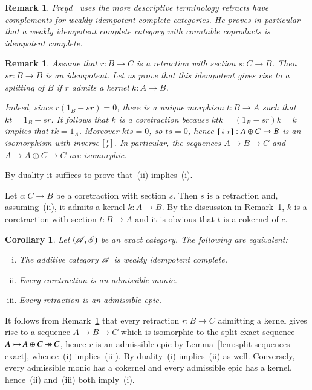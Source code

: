 \documentclass[1p]{elsarticle}
\makeatletter
\renewenvironment{proof}[1][\proofname]{\par
  \pushQED{\qed}%
  \normalfont \topsep6\p@\@plus6\p@\relax
  \trivlist
  \item[\hskip\labelsep
        \scshape
    #1\@addpunct{.}]\ignorespaces
}{%
  \popQED\endtrivlist\@endpefalse
}
\theoremstyle{mythm}
\newtheorem{Cor}[Thm]{Corollary}
\theoremstyle{mydef}
\newtheorem{Rem}[Thm]{Remark}
\makeatother
\begin{document}
\begin{Rem}
  Freyd~\cite{MR0206069} uses the more descriptive terminology
  \emph{retracts have complements} for weakly idempotent complete
  categories. He proves in particular that a weakly idempotent
  complete category with countable coproducts is idempotent complete.
\end{Rem}


\begin{Rem}
  \label{rem:split-special-idempotents}
  Assume that $r: B \to C$ is a retraction with section $s: C \to
  B$. Then
  $sr: B \to B$ is an idempotent. Let us prove that this idempotent
  gives rise to a splitting of $B$ if $r$ admits a kernel
  $k: A \to B$.

  Indeed, since $r(1_{B} - sr) = 0$, there is
  a unique morphism $t: B \to A$ such that $kt = 1_{B} - sr$. It
  follows that $k$ is a coretraction because $ktk = (1_{B} - sr)k = k$
  implies that $tk = 1_{A}$. Moreover $kts = 0$, so $ts = 0$, hence
  $\left[\begin{smallmatrix} k & s \end{smallmatrix}\right] : A \oplus C \to B$
  is an isomorphism with inverse $\left[\begin{smallmatrix} t \\ r \end{smallmatrix}\right]$. In particular, the
  sequences $A \to B \to C$ and $A \to A \oplus C \to C$ are
  isomorphic.
\end{Rem}

\begin{proof}[Proof of Lemma~\ref{lem:weakly-idempotent-complete}]
  By duality it suffices to prove that~(ii) implies~(i).
  
  Let $c: C \to B$ be a coretraction with section $s$. Then $s$ is
  a retraction and, assuming~(ii), it admits a kernel $k: A \to B$. By
  the discussion in Remark~\ref{rem:split-special-idempotents},
  $k$ is a coretraction with 
  section $t: B \to A$ and it is obvious that $t$ is a cokernel of $c$.
\end{proof}

\begin{Cor}
  Let $(\operatorname{\mathscr{A}}, \operatorname{\mathscr{E}})$ be an exact category. The following are
  equivalent:
  \begin{enumerate}[(i)]
    \item
      The additive category $\operatorname{\mathscr{A}}$ is weakly idempotent complete.

    \item
      Every coretraction is an admissible monic.
      
    \item
      Every retraction is an admissible epic.
  \end{enumerate}
\end{Cor}
\begin{proof}
  It follows from Remark~\ref{rem:split-special-idempotents} that every
  retraction $r: B \to C$ admitting a kernel gives rise to a
  sequence $A \to B \to C$ which is isomorphic to the split exact sequence
  $A \operatorname{\rightarrowtail} A \oplus C \operatorname{\twoheadrightarrow} C$, hence $r$ is an admissible epic by
  Lemma~\ref{lem:split-sequences-exact}, whence~(i) implies~(iii).
  By duality~(i) implies~(ii) as well.
  Conversely, every admissible monic has a cokernel and every
  admissible epic has a kernel, hence~(ii)
  and~(iii) both imply~(i).
\end{proof}
\end{document}

